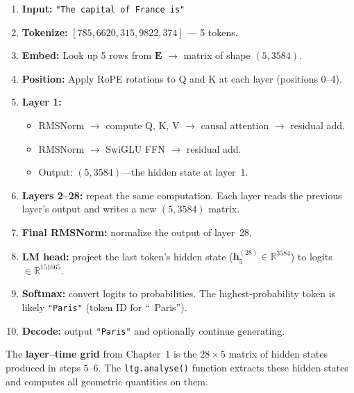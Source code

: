 \documentclass[11pt, twoside, openright]{memoir}
\begin{document}
\begin{enumerate}
\item \textbf{Input:} \texttt{"The capital of France is"}

\item \textbf{Tokenize:} $[785, 6620, 315, 9822, 374]$ --- 5 tokens.

\item \textbf{Embed:} Look up 5 rows from $\mathbf{E}$
  $\to$ matrix of shape $(5, 3584)$.

\item \textbf{Position:} Apply RoPE rotations to Q and K at each layer
  (positions 0--4).

\item \textbf{Layer 1:}
  \begin{itemize}[nosep]
  \item RMSNorm $\to$ compute Q, K, V $\to$ causal attention $\to$
    residual add.
  \item RMSNorm $\to$ SwiGLU FFN $\to$ residual add.
  \item Output: $(5, 3584)$---the hidden state at layer~1.
  \end{itemize}

\item \textbf{Layers 2--28:} repeat the same computation.  Each layer reads
  the previous layer's output and writes a new $(5, 3584)$ matrix.

\item \textbf{Final RMSNorm:} normalize the output of layer~28.

\item \textbf{LM head:} project the last token's hidden state
  ($\mathbf{h}^{(28)}_5 \in \mathbb{R}^{3584}$) to logits
  $\in \mathbb{R}^{151665}$.

\item \textbf{Softmax:} convert logits to probabilities.  The
  highest-probability token is likely \texttt{"Paris"} (token ID for
  ``~Paris'').

\item \textbf{Decode:} output \texttt{"Paris"} and optionally continue
  generating.
\end{enumerate}

The \textbf{layer--time grid} from Chapter~1 is the $28 \times 5$ matrix
of hidden states produced in steps 5--6.  The \texttt{ltg.analyse()} function
extracts these hidden states and computes all geometric quantities on them.

\end{document}
